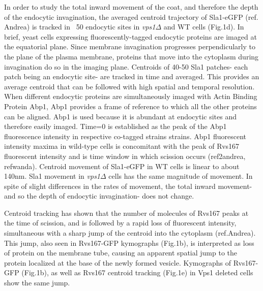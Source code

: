 \documentclass[9pt,lineno]{elife}
\begin{document}
In order to study the total inward movement of the coat, and therefore the depth of the endocytic invagination, the averaged centroid trajectory of Sla1-eGFP (ref. Andrea) is tracked in ~50 endocytic sites in \textit{vps1$\Delta$} and WT cells (Fig.1d). In brief, yeast cells expressing fluorescently-tagged endocytic proteins are imaged at the equatorial plane. Since membrane invagination progresses perpendicularly to the plane of the plasma membrane, proteins that move into the cytoplasm during invagination do so in the imaging plane. Centroids of 40-50 Sla1 patches- each patch being an endocytic site- are tracked in time and  averaged. This provides an average centroid that can be followed with high spatial and temporal resolution. 
When different endocytic proteins are simultaneously imaged with Actin Binding Protein Abp1, Abp1 provides a frame of reference to which all the other proteins can be aligned. Abp1 is used because it is abundant at endocytic sites and therefore easily imaged. Time=0 is established as the peak of the Abp1 fluorescence intensity in respective co-tagged strains strains. Abp1 fluorescent intensity maxima in wild-type cells is concomitant with the peak of Rvs167 fluorescent intensity and is time window in which scission occurs (ref2andrea, refwanda).  
Centroid movement of Sla1-eGFP in WT cells is linear to about 140nm. Sla1 movement in \textit{vps1$\Delta$} cells has the same magnitude of movement. In spite of slight differences in the rates of movement, the total inward movement- and so the depth of endocytic invagination- does not change. 

Centroid tracking has shown that the number of molecules of Rvs167 peaks at the time of scission, and is followed by a rapid loss of fluorescent intensity, simultaneous with a sharp jump of the centroid into the cytoplasm (ref.Andrea). This jump, also seen in Rvs167-GFP kymographs (Fig.1b), is interpreted as loss of protein on the membrane tube, causing an apparent spatial jump to the protein localized at the base of the newly formed vesicle. Kymographs of Rvs167-GFP (Fig.1b), as well as Rvs167 centroid tracking (Fig.1e) in Vps1 deleted cells show the same jump.
~\\
\end{document}
